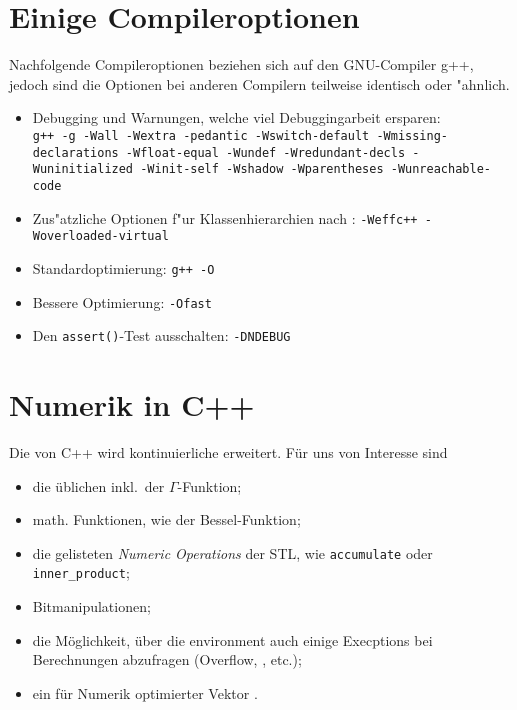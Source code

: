%
%
\section{Einige Compileroptionen}
\label{sec:11.5}
%
Nachfolgende Compileroptionen beziehen sich auf den GNU-Compiler g++, jedoch 
sind die Optionen bei anderen Compilern teilweise identisch oder "ahnlich.
\begin{itemize}
 \item Debugging und Warnungen, welche viel Debuggingarbeit ersparen: \\
 	\texttt{g++ -g -Wall -Wextra -pedantic -Wswitch-default -Wmissing-declarations -Wfloat-equal -Wundef -Wredundant-decls -Wuninitialized -Winit-self -Wshadow -Wparentheses -Wunreachable-code}
 \item Zus"atzliche Optionen f"ur Klassenhierarchien nach \cite{Meyers:1998:ECP,Meyers:1997:MEC}:
 	\texttt{-Weffc++ -Woverloaded-virtual}
 \item Standardoptimierung:
 	\texttt{g++ -O}
 \item Bessere Optimierung:
 	\texttt{-Ofast}
 \item Den \texttt{assert()}-Test ausschalten:
     \texttt{-DNDEBUG}
\end{itemize}
 
 
%
%
\section{Numerik in C++}
\label{sec:11.6}
%
Die  von C++ wird 
kontinuierliche erweitert. 
Für uns von Interesse sind 
\begin{itemize}
 \item die üblichen  inkl.\  der $\Gamma$-Funktion;
 \item {} math. Funktionen, wie der Bessel-Funktion; 
 \item die gelisteten \emph{Numeric Operations} der STL, wie \texttt{accumulate} oder \texttt{inner\_product};
 \item Bitmanipulationen;
 \item die Möglichkeit, über die  environment auch einige 
 Execptions bei Berechnungen abzufragen 
 (Overflow, , etc.);
 \item ein für Numerik optimierter Vektor .
\end{itemize}
%


